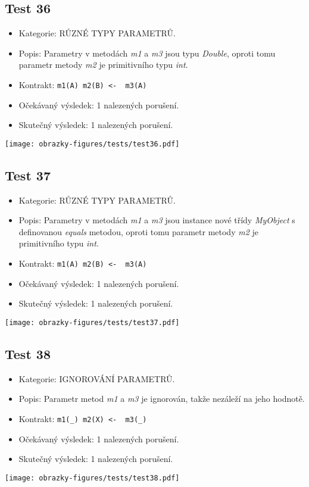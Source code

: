 \subsection*{Test 36}
\begin{itemize}
\item Kategorie: RŮZNÉ TYPY PARAMETRŮ.
\item Popis: Parametry v metodách \textit{m1} a \textit{m3} jsou typu \textit{Double}, oproti tomu parametr metody \textit{m2} je primitivního typu \textit{int}. 
\item Kontrakt: \texttt{m1(A) m2(B) <- { m3(A) }}
\item Očekávaný výsledek: 1 nalezených porušení.

\item Skutečný výsledek: 1 nalezených porušení.
\end{itemize}
\begin{center}
    \centering
    \texttt{[image: obrazky-figures/tests/test36.pdf]}
    \label{test36}
\end{center}

\subsection*{Test 37}
\begin{itemize}
\item Kategorie: RŮZNÉ TYPY PARAMETRŮ.
\item Popis: Parametry v metodách \textit{m1} a \textit{m3} jsou instance nové třídy \textit{MyObject} s definovanou \textit{equals} metodou, oproti tomu parametr metody \textit{m2} je primitivního typu \textit{int}. 
\item Kontrakt: \texttt{m1(A) m2(B) <- { m3(A) }}

\item Očekávaný výsledek: 1 nalezených porušení.
\item Skutečný výsledek: 1 nalezených porušení.
\end{itemize}
\begin{center}
    \centering
    \texttt{[image: obrazky-figures/tests/test37.pdf]}
    \label{test37}
\end{center}
\subsection*{Test 38}
\begin{itemize}
\item Kategorie: IGNOROVÁNÍ PARAMETRŮ.
\item Popis: Parametr metod \textit{m1} a \textit{m3} je ignorován, takže nezáleží na jeho hodnotě. 
\item Kontrakt: \texttt{m1(_) m2(X) <- { m3(_) }}
\item Očekávaný výsledek: 1 nalezených porušení.

\item Skutečný výsledek: 1 nalezených porušení.
\end{itemize}
\begin{center}
    \centering
    \texttt{[image: obrazky-figures/tests/test38.pdf]}
    \label{test38}
\end{center}
